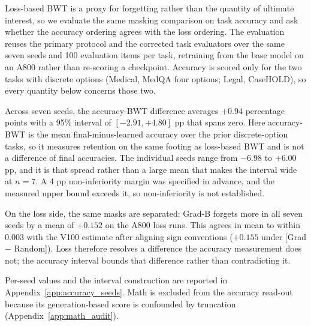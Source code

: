 Loss-based BWT is a proxy for forgetting rather than the quantity of ultimate interest, so we evaluate
the same masking comparison on task accuracy and ask whether the accuracy ordering agrees with
the loss ordering. The evaluation reuses the primary protocol and the corrected task evaluators over
the same seven seeds and 100 evaluation items per task, retraining from the base model on an A800
rather than re-scoring a checkpoint. Accuracy is scored only for the two tasks with discrete options
(Medical, MedQA four options; Legal, CaseHOLD), so every quantity below concerns those two.

Across seven seeds, the accuracy-BWT difference averages $+0.94$ percentage points with a
95\% interval of $[-2.91,+4.80]$ pp that spans zero. Here accuracy-BWT is the mean
final-minus-learned accuracy over the prior discrete-option tasks, so it measures retention on the
same footing as loss-based BWT and is not a difference of final accuracies. The individual seeds
range from $-6.98$ to $+6.00$ pp, and it is that spread rather than a large mean that makes the
interval wide at $n=7$. A 4 pp non-inferiority margin was specified in advance, and the measured
upper bound exceeds it, so non-inferiority is not established.

On the loss side, the same masks are separated: Grad-B forgets more in all seven seeds by a mean
of $+0.152$ on the A800 loss runs. This agrees in mean to within $0.003$ with the V100 estimate
after aligning sign conventions ($+0.155$ under [Grad $-$ Random]). Loss therefore resolves a
difference the accuracy measurement does not; the accuracy interval bounds that difference rather
than contradicting it.

Per-seed values and the interval construction are reported in Appendix~\ref{app:accuracy_seeds}.
Math is excluded from the accuracy read-out because its generation-based score is confounded by
truncation (Appendix~\ref{app:math_audit}).

